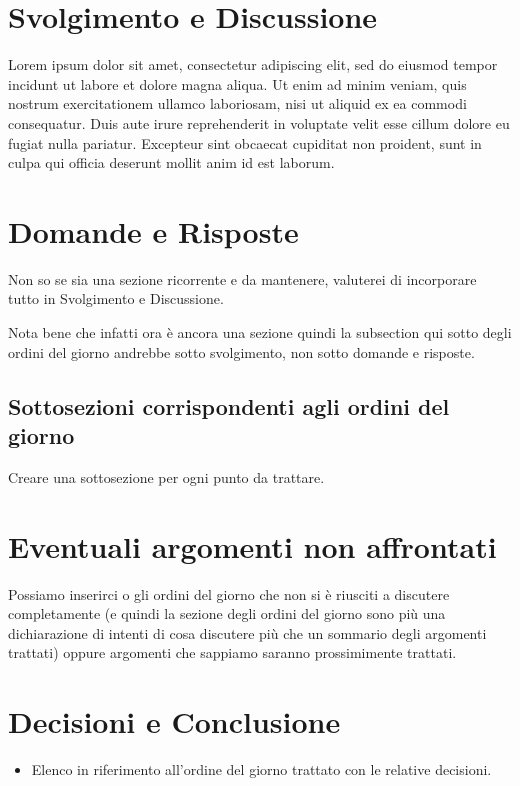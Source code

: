 \documentclass[a4paper,12pt]{article}
\begin{document}
\section{Svolgimento e Discussione}
Lorem ipsum dolor sit amet, consectetur adipiscing elit, sed do eiusmod tempor incidunt ut labore et dolore magna aliqua. Ut enim ad minim veniam, quis nostrum exercitationem ullamco laboriosam, nisi ut aliquid ex ea commodi consequatur. Duis aute irure reprehenderit in voluptate velit esse cillum dolore eu fugiat nulla pariatur. Excepteur sint obcaecat cupiditat non proident, sunt in culpa qui officia deserunt mollit anim id est laborum.


\section{Domande e Risposte}
Non so se sia una sezione ricorrente e da mantenere, valuterei di incorporare tutto in Svolgimento e Discussione. \\

\begin{infobox}
Nota bene che infatti ora è ancora una sezione quindi la subsection qui sotto degli ordini del giorno andrebbe sotto svolgimento, non sotto domande e risposte.
\end{infobox}


\subsection{Sottosezioni corrispondenti agli ordini del giorno}
Creare una sottosezione per ogni punto da trattare.

\section{Eventuali argomenti non affrontati}
Possiamo inserirci o gli ordini del giorno che non si è riusciti a discutere completamente (e quindi la sezione degli ordini del giorno sono più una dichiarazione di intenti di cosa discutere più che un sommario degli argomenti trattati) oppure argomenti che sappiamo saranno prossimimente trattati.

\section{Decisioni e Conclusione}
\begin{itemize}
    \item Elenco in riferimento all'ordine del giorno trattato con le relative decisioni.
\end{itemize}
\end{document}
